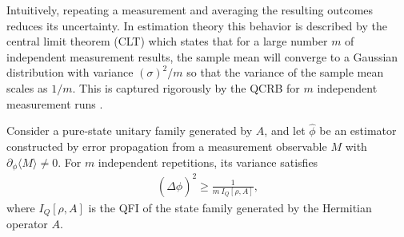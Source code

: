 Intuitively, repeating a measurement and averaging the resulting outcomes reduces its uncertainty.
In estimation theory this behavior is described by the central limit theorem (CLT) \cite{cramer1946mathematical} which states that for a large number $m$ of independent measurement
results, the sample mean will converge to a Gaussian distribution with variance 
$(\sigma)^2/m$ so that the variance of the sample mean scales as $1/m$.
This is captured rigorously by the QCRB for $m$ independent measurement runs \cite{giovannettiQuantumMetrology2006}.
\begin{theorem}\label{thm:qcrb}
Consider a pure-state unitary family generated by $A$, and let $\hat\phi$ be an estimator constructed by error propagation from a measurement observable $M$ with $\partial_\phi\langle M\rangle\neq0$. 
For $m$ independent repetitions, its variance satisfies
\begin{align}
    (\Delta \hat \phi)^2\geq \frac{1}{m\ I_Q[\rho , A]},
\end{align}
where $I_Q[\rho , A]$ is the QFI of the state family generated by the Hermitian operator $A$.
\end{theorem}
